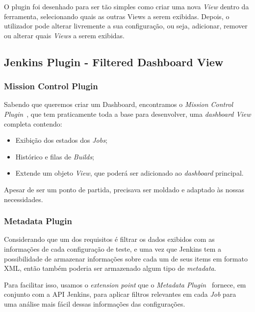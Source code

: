 \documentclass[9pt,a4paper]{extarticle}
\begin{document}
\begin{multicols}{2}
O plugin foi desenhado para ser tão simples como criar uma nova \textit{View} dentro da ferramenta, selecionando quais as outras Views a serem exibidas. Depois, o utilizador pode alterar livremente a sua configuração, ou seja, adicionar, remover ou alterar quais \textit{Views} a serem exibidas.

\subsection{Jenkins Plugin - Filtered Dashboard View}\label{sc:dashboard}

\subsubsection{Mission Control Plugin}\label{mission_plugin}

Sabendo que queremos criar um Dashboard, encontramos o \textit{Mission Control Plugin}~\cite{jkns:missionC}, que tem praticamente toda a base para desenvolver, uma \textit{dashboard View} completa contendo:

\begin{itemize}
\item Exibição dos estados dos \textit{Jobs};
\item Histórico e filas de \textit{Builds};
\item Extende um objeto \textit{View}, que poderá ser adicionado ao \textit{dashboard} principal.
\end{itemize}

Apesar de ser um ponto de partida, precisava ser moldado e adaptado às nossas necessidades.

\subsubsection{Metadata Plugin}\label{metadata_plugin}

Considerando que um dos requisitos é filtrar os dados exibidos com as informações de cada configuração de teste, e uma vez que Jenkins tem a possibilidade de armazenar informações sobre cada um de seus items em formato XML, então também poderia ser armazenado algum tipo de \textit{metadata}.

Para facilitar isso, usamos o \textit{extension point} que o \textit{Metadata Plugin}~\cite{jkns:metadata} fornece, em conjunto com a API Jenkins, para aplicar filtros relevantes em cada \textit{Job} para uma análise mais fácil dessas informações das configurações.


\end{multicols}
\end{document}
